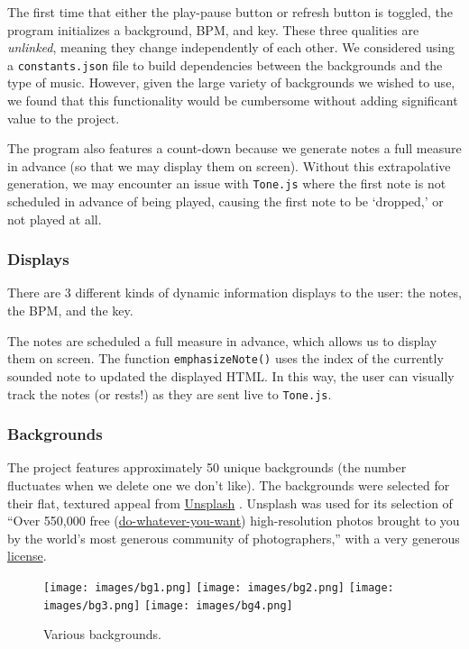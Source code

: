 \documentclass[12pt,a4paper]{article}
\newcommand{\lightcode}[1]{\colorbox{light-gray}{\texttt{#1}}}
\begin{document}
The first time that either the play-pause button or refresh button is toggled, the program initializes a background, BPM, and key. These three qualities are \textit{unlinked}, meaning they change independently of each other. We considered using a \lightcode{constants.json} file to build dependencies between the backgrounds and the type of music. However, given the large variety of backgrounds we wished to use, we found that this functionality would be cumbersome without adding significant value to the project. 

The program also features a count-down because we generate notes a full measure in advance (so that we may display them on screen). Without this extrapolative generation, we may encounter an issue with \lightcode{Tone.js} where the first note is not scheduled in advance of being played, causing the first note to be `dropped,' or not played at all.

\subsubsection{Displays}

There are 3 different kinds of dynamic information displays to the user: the notes, the BPM, and the key. 

The notes are scheduled a full measure in advance, which allows us to display them on screen. The function \lightcode{emphasizeNote()} uses the index of the currently sounded note to updated the displayed HTML. In this way, the user can visually track the notes (or rests!) as they are sent live to \lightcode{Tone.js}.


\subsubsection{Backgrounds}

The project features approximately 50 unique backgrounds (the number fluctuates when we delete one we don't like). The backgrounds were selected for their flat, textured appeal from \href{https://unsplash.com/about}{Unsplash} \cite{unsplash}. Unsplash was used for its selection of ``Over 550,000 free (\href{https://unsplash.com/license}{do-whatever-you-want}) high-resolution photos brought to you by the world’s most generous community of photographers,'' with a very generous \href{https://unsplash.com/license}{license}.

\begin{figure}
\centering\texttt{[image: images/bg1.png]}
\centering\texttt{[image: images/bg2.png]}
\centering\texttt{[image: images/bg3.png]}
\centering\texttt{[image: images/bg4.png]}
\caption{Various backgrounds.}
\end{figure}
\end{document}
